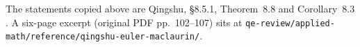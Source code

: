 \begin{remark}
\label{rem:p1-qingshu-em}
The statements copied above are Qingshu, \S8.5.1, Theorem~8.8 and Corollary~8.3 \cite{qingshu11}. A six-page excerpt (original PDF pp.~102--107) sits at \texttt{qe-review/applied-math/reference/qingshu-euler-maclaurin/}.
\end{remark}

\setcounter{section}{2}
